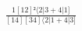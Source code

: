 \documentclass[varwidth, border=5pt]{standalone}
\begin{document}
\begin{my}
$\begin{gathered}
\scriptscriptstyle\frac{1[12]²⟨2|3+4|1]}{[14][34]⟨2|1+4|3]}
\end{gathered}$
\end{my}
\end{document}
